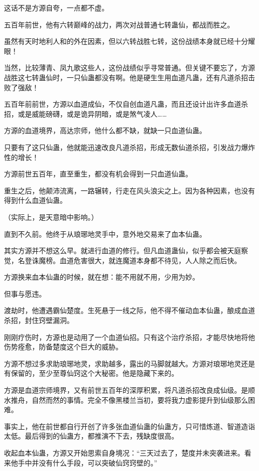 \begin{this_body}
这话不是方源自夸，一点都不虚。

五百年前世，他有六转巅峰的战力，两次对战普通七转蛊仙，都战而胜之。

虽然有天时地利人和的外在因素，但以六转战胜七转，这份战绩本身就已经十分耀眼！

当然，比较薄青、凤九歌这些人，这份战绩似乎寻常普通。但关键不要忘了，方源战胜这七转蛊仙时，一只仙蛊都没有啊。他是硬生生用血道凡蛊，还有凡道杀招击败了强敌！

五百年前前世，方源以血道成仙，不仅自创血道凡蛊，而且还设计出许多血道杀招，或是威能磅礴，或是诡异阴暗，或是煞气凌人……

方源的血道境界，高达宗师，他什么都不缺，就缺一只血道仙蛊。

只要有了这只仙蛊，他就能迅速改良凡道杀招，形成无数仙道杀招，引发战力爆炸性的增长！

方源前世五百年，直至重生，都没有机会得到一只血道仙蛊。

重生之后，他颠沛流离，一路辗转，行走在风头浪尖之上。因为各种因素，也没有得到什么血道仙蛊。

（实际上，是天意暗中影响。）

直到不久前。他终于从琅琊地灵手中，意外地交易来了血本仙蛊。

其实方源并不想这么早。就进行血道的修行。但凡血道蛊仙，似乎都会被天庭察觉，名登诛魔榜。血道危害很大，就连魔道本身都不待见，人人除之而后快。

方源换来血本仙蛊的时候，就在想：能不用就不用，少用为妙。

但事与愿违。

渡劫时，他遭遇霸仙楚度。生死悬于一线之际，他不得不催动血本仙蛊，酿成血道杀招，封住窍壁漏洞。

刚刚疗伤时，方源也是动用了一个血道仙招。只有这个治疗杀招，才能尽快地将他伤势痊愈，防备楚度这个巨大的威胁。

方源不想过多求助琅琊地灵，求助越多，露出的马脚就越大。方源对琅琊地灵还是有保留的，至少至尊仙窍这个大秘密。他是隐藏下来的。

方源是血道宗师境界，又有前世五百年的深厚积累，将凡道杀招改良成仙级。是顺水推舟，自然而然的事情。完全不像黑楼兰当初，要将我力虚影提升到仙级那么困难。

事实上，他在前世都自行开创了许多张血道仙蛊的仙蛊方，只可惜炼道、智道造诣太低。最后得到的仙蛊方，都推演不下去，残缺度很高。

收起血本仙蛊，方源又开始思索自身境况：“三天过去了，楚度并未突袭进来。看来他手中并没有什么手段，可以突破仙窍窍壁的。”


\end{this_body}
